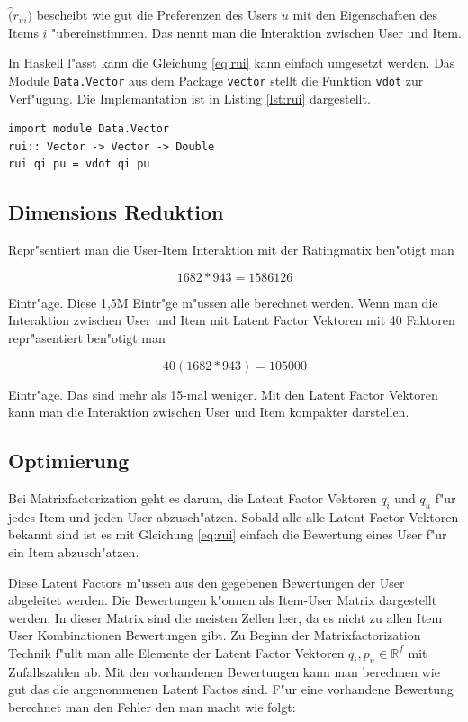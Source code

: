 \documentclass[a4paper, 12pt]{article}
\begin{document}
$\hat(r_{ui})$ bescheibt wie gut die Preferenzen des Users $u$ mit den Eigenschaften des Items $i$ "ubereinstimmen. Das nennt man die Interaktion zwischen User und Item.

In Haskell l"asst kann die Gleichung \ref{eq:rui} kann einfach umgesetzt werden. Das Module \verb|Data.Vector| aus dem Package \verb|vector| stellt die Funktion \verb|vdot| zur Verf"ugung. Die Implemantation ist in Listing \ref{lst:rui} dargestellt.

\begin{lstlisting}[caption=Implementation der Vorhersage, label=lst:rui]
import module Data.Vector
rui:: Vector -> Vector -> Double
rui qi pu = vdot qi pu
\end{lstlisting}

\subsection{Dimensions Reduktion}
\label{sec:dimred}

Repr"sentiert man die User-Item Interaktion mit der Ratingmatix ben"otigt man 

\begin{equation}
  \label{eq:dimre}
  1682 * 943 = 1586126
\end{equation}

Eintr"age. Diese 1,5M Eintr"ge m"ussen alle berechnet werden. Wenn man die Interaktion zwischen User und Item mit Latent Factor Vektoren mit 40 Faktoren repr"asentiert ben"otigt man 

\begin{equation}
  \label{eq:dimred}
  40(1682*943) = 105000
\end{equation}

Eintr"age. Das sind mehr als 15-mal weniger. Mit den Latent Factor Vektoren kann man die Interaktion zwischen User und Item kompakter darstellen.

\subsection{Optimierung}
\label{sec:optim}

Bei Matrixfactorization geht es darum, die Latent Factor Vektoren $q_i$ und $q_u$ f"ur jedes Item und jeden User abzusch"atzen. Sobald alle alle Latent Factor Vektoren bekannt sind ist es mit Gleichung \ref{eq:rui} einfach die Bewertung eines User f"ur ein Item abzusch"atzen.

Diese Latent Factors m"ussen aus den gegebenen Bewertungen der User abgeleitet werden. Die Bewertungen k"onnen als Item-User Matrix dargestellt werden. In dieser Matrix sind die meisten Zellen leer, da es nicht zu allen Item User Kombinationen Bewertungen gibt. Zu Beginn der Matrixfactorization Technik f"ullt man alle Elemente der Latent Factor Vektoren $q_i, p_u \in \mathbb{R}^f$ mit Zufallszahlen ab. Mit den vorhandenen Bewertungen kann man berechnen wie gut das die angenommenen Latent Factos sind. F"ur eine vorhandene Bewertung berechnet man den Fehler den man macht wie folgt:
\end{document}

